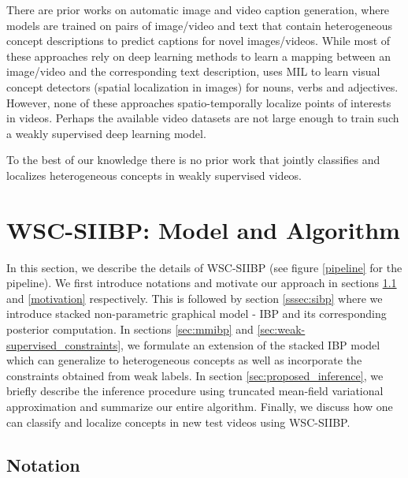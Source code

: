 \documentclass[runningheads]{llncs}
\begin{document}
 There are prior works on automatic image \cite{karpathy2015deep,xu2015show,fang2015captions} and video \cite{venugopalan2015sequence,rohrbach2015long,cho2015describing} caption generation, where models are trained on pairs of image/video and text that contain heterogeneous concept descriptions to predict captions for novel images/videos. While most of these approaches rely on deep learning methods to learn a mapping between an image/video and the corresponding text description, \cite{fang2015captions} uses MIL to learn visual concept detectors (spatial localization in images) for nouns, verbs and adjectives. However, none of these approaches spatio-temporally localize points of interests in videos. Perhaps the available video datasets are not large enough to train such a weakly supervised deep learning model. 

To the best of our knowledge there is no prior work that jointly classifies and localizes heterogeneous concepts in weakly supervised videos.

\section{WSC-SIIBP: Model and Algorithm}

In this section, we describe the details of WSC-SIIBP (see figure \ref{pipeline} for the pipeline). We first introduce notations and motivate our approach in sections \ref{problem_formulation} and \ref{motivation} respectively. This is followed by section \ref{sssec:sibp} where we introduce stacked non-parametric graphical model - IBP and its corresponding posterior computation. In sections \ref{sec:mmibp} and \ref{sec:weak-supervised_constraints}, we formulate an extension of the stacked IBP model which can generalize to heterogeneous concepts as well as incorporate the constraints obtained from weak labels. In section \ref{sec:proposed_inference}, we briefly describe the inference procedure using truncated mean-field variational approximation and summarize our entire algorithm. 
Finally, we discuss how one can classify and localize concepts in new test videos using WSC-SIIBP.

\subsection{Notation}
\label{problem_formulation}
\end{document}
